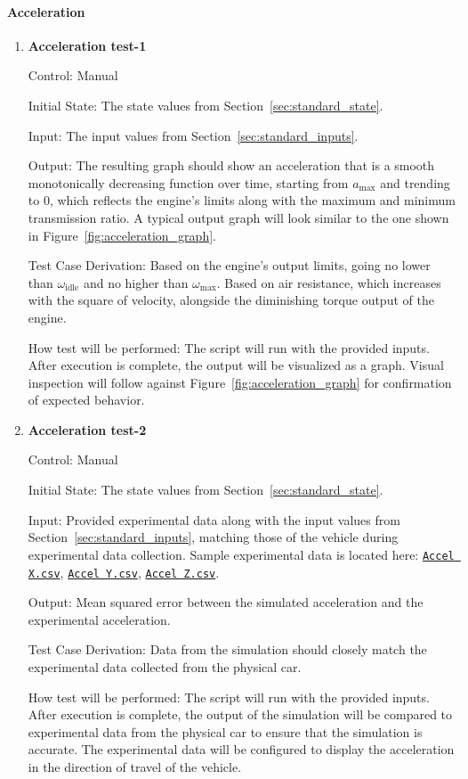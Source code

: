 \documentclass[12pt, titlepage]{article}
\newcommand{\refdata}[2]{
  \href{https://github.com/gr812b/CVT-Simulator/blob/main/experimental-data/#1
  }{\texttt{#2}}}
\begin{document}
\paragraph{Acceleration}

\begin{enumerate}

  \item {} \hypertarget{Acceleration test-1}{\textbf{Acceleration test-1}} \label{Acceleration test-1}
  
  Control: Manual
            
  Initial State: The state values from Section~\ref{sec:standard_state}.
  
  Input: The input values from Section~\ref{sec:standard_inputs}.
            
  Output: The resulting graph should show an acceleration that is a smooth monotonically decreasing function over time, starting from $a_\text{max}$ and trending to 0, which reflects the engine's limits along with the maximum and minimum transmission ratio. A typical output graph will look similar to the one shown in Figure~\ref{fig:acceleration_graph}.
  
  Test Case Derivation: Based on the engine's output limits, going no lower than $\omega_\text{idle}$ and no higher than $\omega_\text{max}$.
  Based on air resistance, which increases with the square of velocity, alongside the diminishing torque output of the engine.
  
  How test will be performed: The script will run with the provided inputs. After execution is complete, the output will be visualized as a graph. Visual inspection will follow against Figure~\ref{fig:acceleration_graph} for confirmation of expected behavior.

  \item {} \hypertarget{Acceleration test-2}{\textbf{Acceleration test-2}} \label{Acceleration test-2}

  Control: Manual

  Initial State: The state values from Section~\ref{sec:standard_state}.

  Input: Provided experimental data along with the input values from Section~\ref{sec:standard_inputs}, matching those of the vehicle during experimental data collection. Sample experimental data is located here: \refdata{IMU\%20ACCEL\%20X.csv}{Accel X.csv}, \refdata{IMU\%20ACCEL\%20Y.csv}{Accel Y.csv}, \refdata{IMU\%20ACCEL\%20Z.csv}{Accel Z.csv}.

  Output: Mean squared error between the simulated acceleration and the experimental acceleration.

  Test Case Derivation: Data from the simulation should closely match the experimental data collected from the physical car.

  How test will be performed: The script will run with the provided inputs. After execution is complete, the output of the simulation will be compared to experimental data from the physical car to ensure that the simulation is accurate. The experimental data will be configured to display the acceleration in the direction of travel of the vehicle.

\end{enumerate}
\end{document}
